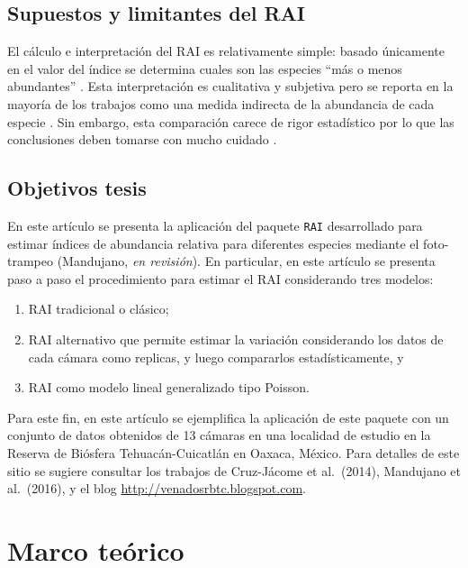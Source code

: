 \documentclass[
  11pt,
]{book}
\providecommand{\tightlist}{%
  \setlength{\itemsep}{0pt}\setlength{\parskip}{0pt}}
\begin{document}
\section{Supuestos y limitantes del RAI}\label{supuestos-y-limitantes-del-rai}

El cálculo e interpretación del RAI es relativamente simple: basado únicamente en el valor del índice se determina cuales son las especies ``más o menos abundantes'' \citep{mccaffery1976deer}. Esta interpretación es cualitativa y subjetiva pero se reporta en la mayoría de los trabajos como una medida indirecta de la abundancia de cada especie \citep{sutherland2006ecological}. Sin embargo, esta comparación carece de rigor estadístico por lo que las conclusiones deben tomarse con mucho cuidado \citep{sutherland2006ecological}.

\section{Objetivos tesis}\label{objetivos-tesis}

En este artículo se presenta la aplicación del paquete \texttt{RAI} desarrollado para estimar índices de abundancia relativa para diferentes especies mediante el foto-trampeo (Mandujano, \emph{en revisión}). En particular, en este artículo se presenta paso a paso el procedimiento para estimar el RAI considerando tres modelos:

\begin{enumerate}
\def\labelenumi{\arabic{enumi})}
\tightlist
\item
  RAI tradicional o clásico;
\item
  RAI alternativo que permite estimar la variación considerando los datos de cada cámara como replicas, y luego compararlos estadísticamente, y
\item
  RAI como modelo lineal generalizado tipo Poisson.
\end{enumerate}

Para este fin, en este artículo se ejemplifica la aplicación de este paquete con un conjunto de datos obtenidos de 13 cámaras en una localidad de estudio en la Reserva de Biósfera Tehuacán-Cuicatlán en Oaxaca, México. Para detalles de este sitio se sugiere consultar los trabajos de Cruz-Jácome et al.~(2014), Mandujano et al.~(2016), y el blog \url{http://venadosrbtc.blogspot.com}.

\chapter{Marco teórico}\label{marco-teuxf3rico}
\end{document}

